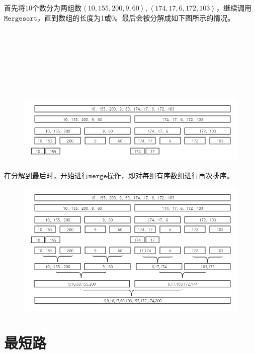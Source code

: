 \documentclass[UTF8,a4paperdui, %
]{ctexart}
\begin{document}
首先将10个数分为两组数$\left \langle10,155,200,9,60\right \rangle ,\left \langle 174,17,6,172,103\right \rangle $，继续调用$\texttt{Mergesort}$，直到数组的长度为1或0。最后会被分解成如下图所示的情况。\\
\\
\\
\\
\\
\\
\\
\\
\begin{figure}[ht]
\centering
\includegraphics[scale=0.6]{1-example1.png}
\end{figure}

在分解到最后时，开始进行$\texttt{merge}$操作，即对每组有序数组进行再次排序。


\begin{figure}[ht]
\centering
\includegraphics[scale=0.5]{1-example3.png}
\end{figure}

\section{最短路}
\end{document}
